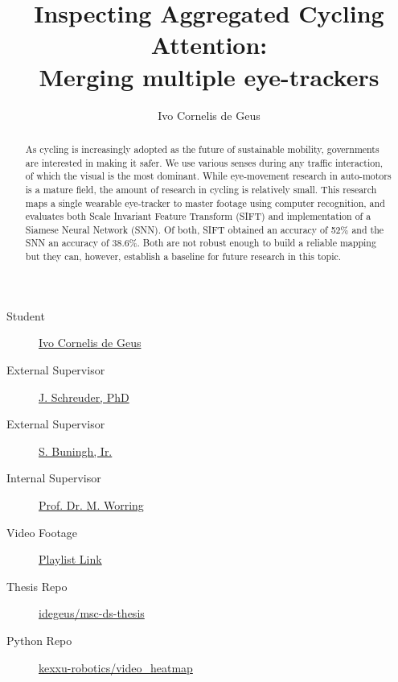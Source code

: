 \documentclass[sigconf, natbib=false, nonacm]{acmart}
\begin{document}

\title{Inspecting Aggregated Cycling Attention: \\ Merging multiple eye-trackers}
\author{Ivo Cornelis de Geus}


\begin{abstract}
    As cycling is increasingly adopted as the future of sustainable mobility, governments are interested in making it safer. We use various senses during any traffic interaction, of which the visual is the most dominant. While eye-movement research in auto-motors is a mature field, the amount of research in cycling is relatively small. This research maps a single wearable eye-tracker to master footage using computer recognition, and evaluates both Scale Invariant Feature Transform (SIFT) and implementation of a Siamese Neural Network (SNN). Of both, SIFT obtained an accuracy of 52\% and the SNN an accuracy of 38.6\%. Both are not robust enough to build a reliable mapping but they can, however, establish a baseline for future research in this topic.
\end{abstract}

\maketitle




\begin{description}
     \item[Student] \href{mailto:ivo.de.geus@student.uva.nl}{Ivo Cornelis de Geus}
     \item[External Supervisor] \href{mailto:jschreuder@kexxu.com}{J. Schreuder, PhD}
     \item[External Supervisor] \href{mailto:sander.buningh@bam.com}{S. Buningh, Ir. }
     \item[Internal Supervisor] \href{mailto:m.worring@uva.nl}{Prof. Dr. M. Worring}
     \item[Video Footage] \href{https://youtube.com/playlist?list=PLzh4mA3kUCz2J9pJhzKEI88LiCYvB9BQk}{Playlist Link}
     \item[Thesis Repo] \href{https://github.com/idegeus/msc-ds-thesis}{idegeus/msc-ds-thesis}
     \item[Python Repo] \href{https://github.com/kexxu-robotics/video_heatmap}{kexxu-robotics/video\_heatmap}
\end{description} 
 
\end{document}
